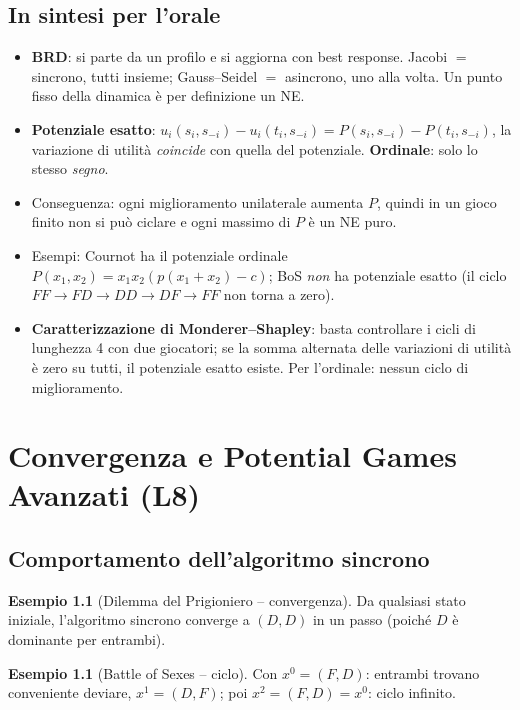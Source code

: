 \documentclass[12pt,a4paper,twoside]{book}
\theoremstyle{plain}
\theoremstyle{definition}
\newtheorem{example}[theorem]{Esempio}
\begin{document}
\section*{In sintesi per l'orale}
\begin{itemize}
  \item \textbf{BRD}: si parte da un profilo e si aggiorna con best response. Jacobi $=$ sincrono, tutti insieme; Gauss--Seidel $=$ asincrono, uno alla volta. Un punto fisso della dinamica è per definizione un NE.
  \item \textbf{Potenziale esatto}: $u_i(s_i,s_{-i})-u_i(t_i,s_{-i})=P(s_i,s_{-i})-P(t_i,s_{-i})$, la variazione di utilità \emph{coincide} con quella del potenziale. \textbf{Ordinale}: solo lo stesso \emph{segno}.
  \item Conseguenza: ogni miglioramento unilaterale aumenta $P$, quindi in un gioco finito non si può ciclare e ogni massimo di $P$ è un NE puro.
  \item Esempi: Cournot ha il potenziale ordinale $P(x_1,x_2)=x_1x_2(p(x_1+x_2)-c)$; BoS \emph{non} ha potenziale esatto (il ciclo $FF\to FD\to DD\to DF\to FF$ non torna a zero).
  \item \textbf{Caratterizzazione di Monderer--Shapley}: basta controllare i cicli di lunghezza 4 con due giocatori; se la somma alternata delle variazioni di utilità è zero su tutti, il potenziale esatto esiste. Per l'ordinale: nessun ciclo di miglioramento.
\end{itemize}

\chapter{Convergenza e Potential Games Avanzati (L8)}

\section{Comportamento dell'algoritmo sincrono}

\begin{example}[Dilemma del Prigioniero -- convergenza]
Da qualsiasi stato iniziale, l'algoritmo sincrono converge a $(D,D)$ in un passo (poiché $D$ è dominante per entrambi).
\end{example}

\begin{example}[Battle of Sexes -- ciclo]
Con $x^0=(F,D)$: entrambi trovano conveniente deviare, $x^1=(D,F)$; poi $x^2=(F,D)=x^0$: ciclo infinito.
\end{example}
\end{document}
